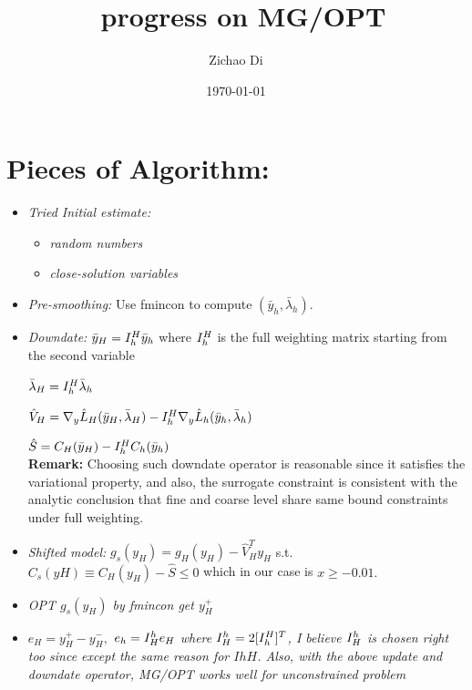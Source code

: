 \documentclass[10pt]{article}
\title{\ progress on MG/OPT}
\author{Zichao Di}
\date{\today}
\begin{document}
  \maketitle 

\section{Pieces of Algorithm:}

\begin{itemize}
\item{\em  Tried Initial estimate:}
\begin{itemize}
\item{\em random numbers}
\item{\em close-solution variables}
\end{itemize}

\item{\em Pre-smoothing:}
Use fmincon to compute $(\bar y_{h}, \bar \lambda_{h})$.\\

\item{\em Downdate:}
$\bar y_{H}=I_h^H \bar y_{h}$ where $I_h^H$ is the full weighting matrix starting from the second variable\

$\bar \lambda_{H}=I_h^H \bar \lambda_{h}$\

$\hat V_{H}=\nabla_{y} \hat L_{H}(\bar y_{H},\bar \lambda_{H})-I_h^H \nabla_{y}\hat L_{h}(\bar y_{h},\bar \lambda_{h})$\

$\hat S= C_{H}(\bar y_{H})-I_h^H C_h(\bar y_{h})$\\

\textbf{Remark:} Choosing such downdate operator is reasonable since it satisfies the variational property, and also, the surrogate constraint is consistent with the analytic conclusion that fine and coarse level share same bound constraints under full weighting.\\

\item{\em Shifted model:}
$g_{s}(y_{H})=g_{H}(y_{H})-\hat V_{H}^{T}y_{H}$ s.t. $C_{s}(yH) \equiv C_{H}(y_{H})-\hat S \leq 0$ which in our case is $x \geq -0.01.$\\

\item {\em OPT $g_{s}(y_{H})$ by fmincon get $y_{H}^{+}$}\\

\item {\em $e_{H}=y_{H}^{+}-y_{H}^{-},$ $e_{h}=I_H^h e_{H}$ where $I_H^h=2[I_h^H]^{T}$, I believe $I_H^h$ is chosen right too since except the same reason for $IhH$. Also, with the above update and downdate operator, MG/OPT works well for unconstrained problem}\\


\end{itemize}
\end{document}
